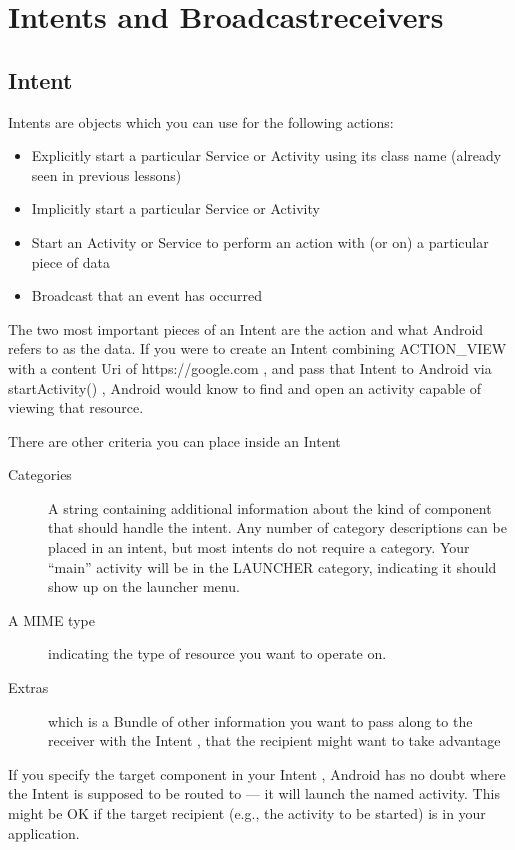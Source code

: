 
\chapter{Intents and Broadcastreceivers}

\section{Intent}
Intents are objects which you can use for the following actions:


\begin{itemize}
	\item Explicitly start a particular Service or Activity using its class name (already seen in previous lessons)
	\item Implicitly start a particular Service or Activity
	\item Start an Activity or Service to perform an action with (or on) a particular piece of data
	\item Broadcast that an event has occurred
\end{itemize}

The two most important pieces of an Intent are the action and what Android refers
to as the data. If you were to create an Intent combining ACTION\_VIEW with a content Uri of
https://google.com , and pass that Intent to Android via startActivity() ,
Android would know to find and open an activity capable of viewing that resource.


There are other criteria you can place inside an Intent
\begin{description}
	\item[Categories] A string containing additional information about the kind of component that should handle the intent. Any number of category descriptions can be placed in an intent, but most intents do not require a category. Your “main” activity will be in the LAUNCHER category, indicating
	it should show up on the launcher menu.
	\item[A MIME type]  indicating the type of resource you want to operate on.
	\item[Extras] which is a Bundle of other information you want to pass along to
	the receiver with the Intent , that the recipient might want to take advantage
\end{description}

If you specify the target component in your Intent , Android has no
doubt where the Intent is supposed to be routed to — it will launch the named
activity. This might be OK if the target recipient (e.g., the activity to be started) is in your application.

